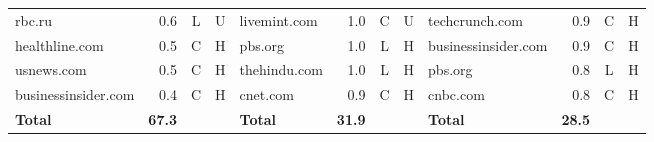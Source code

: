 \begin{table*}[htbp]
\begin{tabular}{lrcc|lrcc|lrcc}
rbc.ru & 0.6 & L & U & livemint.com & 1.0 & C & U & techcrunch.com & 0.9 & C & H \\
healthline.com & 0.5 & C & H & pbs.org & 1.0 & L & H & businessinsider.com & 0.9 & C & H \\
usnews.com & 0.5 & C & H & thehindu.com & 1.0 & L & H & pbs.org & 0.8 & L & H \\
businessinsider.com & 0.4 & C & H & cnet.com & 0.9 & C & H & cnbc.com & 0.8 & C & H \\
\midrule
\textbf{Total} & \textbf{67.3} &  &  & \textbf{Total} & \textbf{31.9} &  &  & \textbf{Total} & \textbf{28.5} &  &  \\
\bottomrule
\end{tabular}
\end{table*}